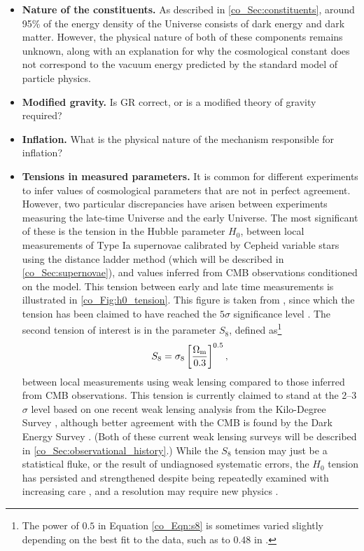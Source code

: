 \begin{itemize}
\item \textbf{Nature of the constituents.} As described in \autoref{co_Sec:constituents}, around 95\% of the energy density of the Universe consists of dark energy and dark matter. However, the physical nature of both of these components remains unknown, along with an explanation for why the cosmological constant does not correspond to the vacuum energy predicted by the standard model of particle physics.
\item \textbf{Modified gravity.} Is GR correct, or is a modified theory of gravity required?
\item \textbf{Inflation.} What is the physical nature of the mechanism responsible for inflation?
\item \textbf{Tensions in measured parameters.} It is common for different experiments to infer values of cosmological parameters that are not in perfect agreement. However, two particular discrepancies have arisen between experiments measuring the late-time Universe and the early Universe. The most significant of these is the tension in the Hubble parameter $H_0$, between local measurements of Type Ia supernovae calibrated by Cepheid variable stars using the distance ladder method (which will be described in \autoref{co_Sec:supernovae}), and values inferred from CMB observations conditioned on the \lcdm{} model. This tension between early and late time measurements is illustrated in \autoref{co_Fig:h0_tension}. This figure is taken from \citet{DiValentino2021Hubble}, since which the tension has been claimed to have reached the $5 \sigma$ significance level \citep{Riess2021b}. The second tension of interest is in the parameter $S_8$, defined as\footnote{The power of $0.5$ in Equation \eqref{co_Eqn:s8} is sometimes varied slightly depending on the best fit to the data, such as to $0.48$ in \citet{Rhodes2001}.}
\begin{equation}
S_8 = \sigma_8 \left[ \frac{\Omega_\text{m}}{0.3} \right]^{0.5},
\label{co_Eqn:s8}
\end{equation}
between local measurements using weak lensing compared to those inferred from CMB observations. This tension is currently claimed to stand at the 2--3$\sigma$ level based on one recent weak lensing analysis from the Kilo-Degree Survey \citep{Heymans2021}, although better agreement with the CMB is found by the Dark Energy Survey \citep{DES2021}. (Both of these current weak lensing surveys will be described in \autoref{co_Sec:observational_history}.) While the $S_8$ tension may just be a statistical fluke, or the result of undiagnosed systematic errors, the $H_0$ tension has persisted and strengthened despite being repeatedly examined with increasing care \citep[e.g.][]{Riess2018b, Riess2018c, Riess2018a, Riess2020, Riess2021a, Riess2021b, Burns2018, Yuan2019, Reid2019, Macaulay2019, Soltis2021, Anand2021, Romaniello2021}, and a resolution may require new physics \citep{DiValentino2021Hubble}.
\end{itemize}


